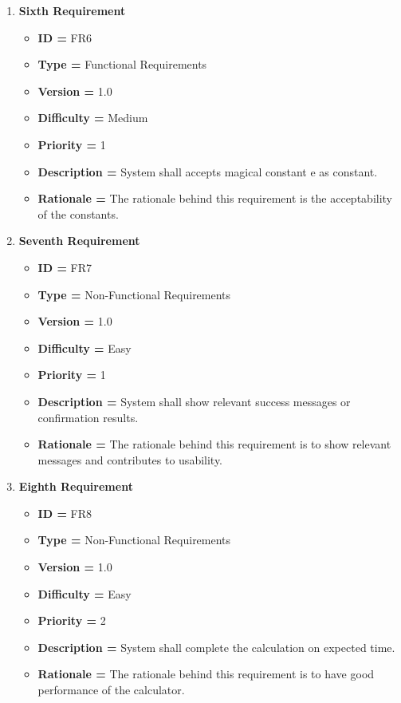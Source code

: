 \documentclass[a4paper,12pt]{article}
\begin{document}
\begin{enumerate}
        \item\textbf{Sixth  Requirement}
        	 \begin{itemize}
            \item \textbf{ID = } FR6
            \item \textbf{Type = } Functional Requirements
            \item \textbf{Version = } 1.0
            \item \textbf{Difficulty = } Medium
            \item \textbf{Priority = } 1
            \item \textbf{Description = } System shall accepts magical constant e as constant.
            \item \textbf{Rationale = }	The rationale behind this requirement is the acceptability of the constants.
            \end{itemize}
        \item\textbf{Seventh  Requirement}
        	 \begin{itemize}
            \item \textbf{ID = } FR7
            \item \textbf{Type = } Non-Functional Requirements
            \item \textbf{Version = } 1.0
            \item \textbf{Difficulty = } Easy
            \item \textbf{Priority = } 1
            \item \textbf{Description = } System shall show relevant success messages or confirmation results.
            \item \textbf{Rationale = }	The rationale behind this requirement is to show relevant messages and contributes to usability.
            \end{itemize}
            
        \item\textbf{Eighth  Requirement}
        	 \begin{itemize}
            \item \textbf{ID = } FR8
            \item \textbf{Type = } Non-Functional Requirements
            \item \textbf{Version = } 1.0
            \item \textbf{Difficulty = } Easy
            \item \textbf{Priority = } 2
            \item \textbf{Description = } System shall complete the calculation on expected time.
            \item \textbf{Rationale = }	The rationale behind this requirement is to have good performance of the calculator.
            \end{itemize}
        \end{enumerate}
        
\end{document}
